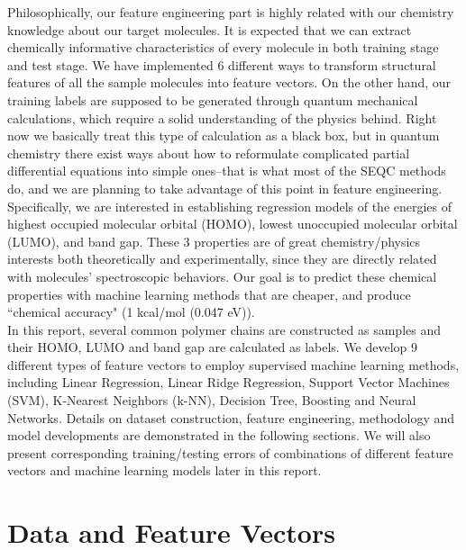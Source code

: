 \documentclass[12pt, oneside]{article}   	%
\begin{document}
Philosophically, our feature engineering part is highly related with our chemistry knowledge about our target molecules. It is expected that we can extract chemically informative characteristics of every molecule in both training stage and test stage. We have implemented 6 different ways to transform structural features of all the sample molecules into feature vectors. On the other hand, our training labels are supposed to be generated through quantum mechanical calculations, which require a solid understanding of the physics behind. Right now we basically treat this type of calculation as a black box, but in quantum chemistry there exist ways about how to reformulate complicated partial differential equations into simple ones--that is what most of the SEQC methods do, and we are planning to take advantage of this point in feature engineering. Specifically, we are interested in establishing regression models of the energies of highest occupied molecular orbital (HOMO), lowest unoccupied molecular orbital (LUMO), and band gap. These 3 properties are of great chemistry/physics interests both theoretically and experimentally, since they are directly related with molecules' spectroscopic behaviors. Our goal is to predict these chemical properties with machine learning methods that are cheaper, and produce ``chemical accuracy" (1 kcal/mol (0.047 eV)).\\

In this report, several common polymer chains are constructed as samples and their HOMO, LUMO and band gap are calculated as labels. We develop 9 different types of feature vectors to employ supervised machine learning methods, including Linear Regression, Linear Ridge Regression, Support Vector Machines (SVM), K-Nearest Neighbors (k-NN), Decision Tree, Boosting and Neural Networks. Details on dataset construction, feature engineering, methodology and model developments are demonstrated in the following sections. We will also present corresponding training/testing errors of combinations of different feature vectors and machine learning models later in this report. \\

\section{Data and Feature Vectors}
\end{document}
